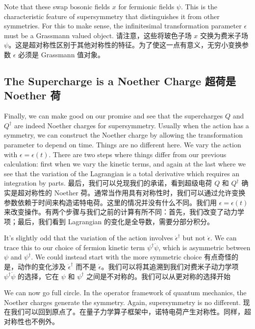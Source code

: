 \documentclass{article}
\newcommand{\SakuraiYukiko}{\emoji{cherry-blossom}\emoji{snowflake}}
\begin{document}
Note that these swap bosonic fields $x$ for fermionic fields $\psi$. This is the characteristic feature of supersymmetry that distinguishes it from other symmetries. For this to make sense, the infinitesimal transformation parameter $\epsilon$ must be a Grassmann valued object.
请注意，这些将玻色子场 $x$ 交换为费米子场 $\psi$。这是超对称性区别于其他对称性的特征。为了使这一点有意义，无穷小变换参数 $\epsilon$ 必须是 Grassmann 值对象。

\subsection*{The Supercharge is a Noether Charge \SakuraiYukiko 超荷是 Noether 荷}

Finally, we can make good on our promise and see that the supercharges $Q$ and $Q^{\dagger}$ are indeed Noether charges for supersymmetry. Usually when the action has a symmetry, we can construct the Noether charge by allowing the transformation parameter to depend on time. Things are no different here. We vary the action with $\epsilon = \epsilon(t)$. There are two steps where things differ from our previous calculation: first when we vary the kinetic terms, and again at the last where we see that the variation of the Lagrangian is a total derivative which requires an integration by parts.
最后，我们可以兑现我们的承诺，看到超级电荷 $Q$ 和 $Q^{\dagger}$ 确实是超对称性的 Noether 荷。通常当作用具有对称性时，我们可以通过允许变换参数依赖于时间来构造诺特电荷。这里的情况并没有什么不同。我们用 $\epsilon = \epsilon(t)$ 来改变操作。有两个步骤与我们之前的计算有所不同：首先，我们改变了动力学项；最后，我们看到 Lagrangian 的变化是全导数，需要分部分积分。

It's slightly odd that the variation of the action involves $\dot{\epsilon}^{\dagger}$ but not $\dot{\epsilon}$. We can trace this to our choice of fermion kinetic term $\psi^{\dagger} \dot{\psi}$, which is asymmetric between $\psi$ and $\psi^{\dagger}$. We could instead start with the more symmetric choice
有点奇怪的是，动作的变化涉及 $\dot{\epsilon}^{\dagger}$ 而不是 $\dot{\epsilon}$。我们可以将其追溯到我们对费米子动力学项 $\psi^{\dagger} \dot{\psi}$ 的选择，它在 $\psi$ 和 $\psi^{\dagger}$ 之间是不对称的。我们可以从更对称的选择开始

We can now go full circle. In the operator framework of quantum mechanics, the Noether charges generate the symmetry. Again, supersymmetry is no different.
现在我们可以回到原点了。在量子力学算子框架中，诺特电荷产生对称性。同样，超对称性也不例外。
\end{document}

